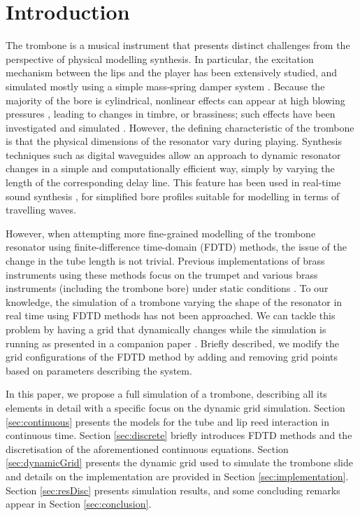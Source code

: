 \section{Introduction}\label{sec:introduction}

The trombone is a musical instrument that presents distinct challenges from the perspective of physical modelling synthesis.
In particular, the excitation mechanism between the lips and the player has been extensively studied, and simulated mostly using a simple mass-spring damper system \cite{campbell2004brass}.
Because the majority of the bore is cylindrical, nonlinear effects can appear at high blowing pressures \cite{Hirschberg96}, leading to changes in timbre, or brassiness; such effects have been investigated and simulated
\cite{campbell2004brass, msallam1997physical,msallam2000physical}.
However, the defining characteristic of the trombone is that the physical dimensions of the resonator vary during playing.
Synthesis techniques such as digital waveguides allow an approach to dynamic resonator changes in a simple and computationally efficient way, simply by varying the length of the corresponding delay line. This feature has been used in real-time sound synthesis \cite{cook2002real}, for simplified bore profiles suitable for modelling in terms of travelling waves.

However, when attempting more fine-grained modelling of the trombone resonator using finite-difference time-domain (FDTD) methods, the issue of the change in the tube length is not trivial. Previous implementations of brass instruments using these methods focus on the trumpet \cite{harrison2015environment} and various brass instruments (including the trombone bore) under static conditions \cite{Bilbao2013}. To our knowledge, the simulation of a trombone varying the shape of the resonator in real time using FDTD methods has not been approached.
We can tackle this problem by having a grid that dynamically changes while the simulation is running as presented in a companion paper \cite{Willemsen2021}. Briefly described, we modify the grid configurations of the FDTD method by adding and removing grid points based on parameters describing the system. 

In this paper, we propose a full simulation of a trombone, describing all its elements in detail with a specific focus on the dynamic grid simulation. Section \ref{sec:continuous} presents the models for the tube and lip reed interaction in continuous time. Section \ref{sec:discrete} briefly introduces FDTD methods and the discretisation of the aforementioned continuous equations. Section \ref{sec:dynamicGrid} presents the dynamic grid used to simulate the trombone slide and details on the implementation are provided in Section \ref{sec:implementation}. Section \ref{sec:resDisc} presents simulation results, and some concluding remarks appear in Section \ref{sec:conclusion}.